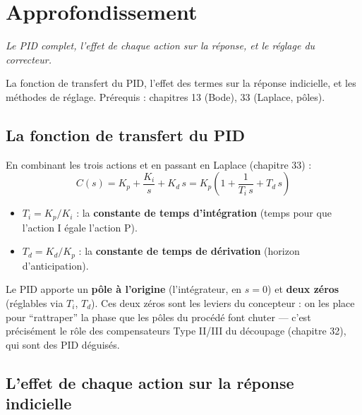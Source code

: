 \documentclass[12pt,a4paper,twoside]{book}
\begin{document}
\section{Approfondissement}

\vspace{0.3cm}
\textit{Le PID complet, l'effet de chaque action sur la réponse, et le réglage du correcteur.}
\vspace{0.3cm}

\begin{approfondissement}
La fonction de transfert du PID, l'effet des termes sur la réponse indicielle, et les méthodes de réglage. Prérequis : chapitres 13 (Bode), 33 (Laplace, pôles).
\end{approfondissement}

\subsection{La fonction de transfert du PID}

\begin{formule}
En combinant les trois actions et en passant en Laplace (chapitre 33) :
\[
\boxed{C(s) = K_p + \frac{K_i}{s} + K_d\,s = K_p\left(1 + \frac{1}{T_i\,s} + T_d\,s\right)}
\]
\begin{itemize}[nosep]
\item $T_i = K_p/K_i$ : la \textbf{constante de temps d'intégration} (temps pour que l'action I égale l'action P).
\item $T_d = K_d/K_p$ : la \textbf{constante de temps de dérivation} (horizon d'anticipation).
\end{itemize}
Le PID apporte un \textbf{pôle à l'origine} (l'intégrateur, en $s = 0$) et \textbf{deux zéros} (réglables via $T_i$, $T_d$). Ces deux zéros sont les leviers du concepteur : on les place pour ``rattraper'' la phase que les pôles du procédé font chuter --- c'est précisément le rôle des compensateurs Type II/III du découpage (chapitre 32), qui sont des PID déguisés.
\end{formule}

\subsection{L'effet de chaque action sur la réponse indicielle}
\end{document}

